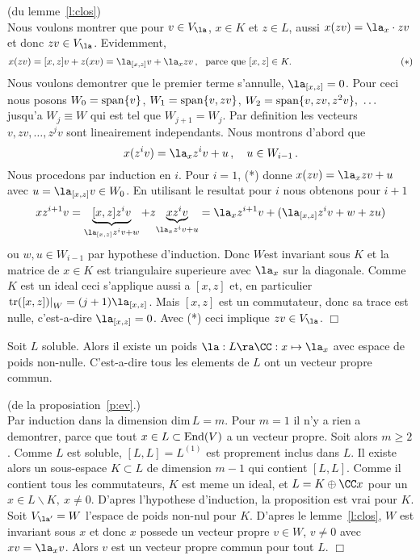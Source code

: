 \begin{prv} (du lemme~\ref{l:clos})\\
Nous voulons montrer que pour $v\in V_\la$, $x\in K$ et $z\in L$, aussi
$x(zv) = \la_x\cdot zv$ et donc $zv\in V_\la$. Evidemment,
$$ x(zv) = [x,z]v +z(xv) =  \la_{[x,z]}v +\la_xzv\,, ~ \mbox{ parce que } [x,z]\in K . \hspace{4cm} (*) $$
Nous voulons demontrer que le premier terme s'annulle, $ \la_{[x,z]}=0$. Pour ceci nous posons
$W_0 = {\rm span}\{v\}$, $W_1 = {\rm span}\{v, zv\}$, 
$W_2 = {\rm span}\{v, zv, z^2v\}, ~ \ldots$
jusqu'a $W_j\equiv W$ qui est tel que $W_{j+1} = W_j$. Par definition les vecteurs
$v,zv,\ldots, z^jv$ sont lineairement independants. Nous montrons d'abord que
$$ x(z^iv) = \la_x z^iv + u\,, \quad u\in W_{i-1} \,. $$
Nous procedons par induction en $i$. Pour $i=1$, (*) donne $ x(zv) = \la_xzv +u$ avec
$u =\la_{[x,z]}v \in W_0$. En utilisant le resultat pour $i$ nous obtenons pour $i+1$
$$xz^{i+1}v =\underbrace{[x,z]z^iv}_{\la_{[x,z]}z^iv + w}+
 z\!\underbrace{xz^iv}_{\la_x z^iv + u}  = \la_x z^{i+1}v + (\la_{[x,z]}z^iv + w + zu) $$
 ou $w,u\in W_{i-1}$ par hypothese d'induction. Donc $W$est invariant sous $K$ et
 la matrice de $x\in K$ est triangulaire superieure avec $\la_x$ sur la diagonale.
 Comme $K$ est un ideal ceci s'applique aussi a $[x,z]$ et, en particulier
 $\left.{\rm tr}([x,z])\right|_W = (j+1)\la_{[x,z]}$. Mais $[x,z]$ est un commutateur, donc sa trace
 est nulle, c'est-a-dire $\la_{[x,z]}=0$. Avec (*) ceci implique $zv\in V_\la$.  \hfill $\Box$
\end{prv}

\begin{ppp}\label{p:ev} Soit $L$ soluble. Alors il existe un poids
$\la : L \ra \CC : x \mapsto \la_x$ avec espace de poids non-nulle. C'est-a-dire tous 
les elements de $L$ ont un vecteur propre commun.
\end{ppp}
\begin{prv} (de la proposiation~\ref{p:ev}.)\\
Par induction dans la dimension dim$\,L =m$. Pour $m=1$ il n'y a rien a 
demontrer, parce que tout $x\in L \subset {\rm End}(V)$ a un vecteur propre. Soit alors 
$m\ge 2$. Comme $L$ est soluble, $[L,L] = L^{(1)}$ est proprement inclus dans $L$. 
Il existe alors un sous-espace $K\subset L$ de dimension $m-1$ qui contient $[L,L]$. Comme
il contient tous les commutateurs, $K$ est meme un ideal, et $L=K\oplus \CC x$ pour un
$x\in L\backslash K,~x\neq 0$. D'apres l'hypothese d'induction, la proposition est vrai pour $K$.
Soit $V_{\la'}=W$ l'espace de poids non-nul pour $K$. D'apres le lemme~\ref{l:clos}, $W$ est
invariant sous $x$ et donc $x$ possede un vecteur propre 
$v\in W$, $v\neq 0$ avec $xv=\la_xv$. Alors $v$ est un vecteur propre commun pour tout $L$.
 \hfill $\Box$
\end{prv}

